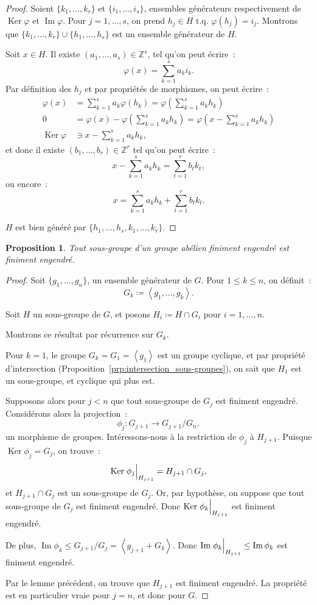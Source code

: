\documentclass{article}
\newtheorem{prp}[thm]{Proposition}
\theoremstyle{definition}
\theoremstyle{remark}
\DeclareMathOperator{\Imf}{Im}
\DeclareMathOperator{\Ker}{Ker}
\newcommand{\Z}{\mathbb Z}
\newcommand{\tq}{\text{ t.q. }}
\newcommand{\eng}[1]{\left\langle#1\right\rangle}
\newcommand{\restr}[2]{\left.#1\vphantom{\big|}\right|_{#2}}
\begin{document}
	\begin{proof} Soient $\{k_1, \ldots, k_r\}$ et $\{i_1, \ldots, i_s\}$, ensembles générateurs respectivement de $\Ker \varphi$ et $\Imf \varphi$.
	Pour $j = 1, \ldots, s$, on prend $h_j \in H \tq \varphi(h_j) = i_j$. Montrons que $\{k_1, \ldots, k_r\} \cup \{h_1, \ldots, h_s\}$ est un ensemble
	générateur de $H$.

	Soit $x \in H$. Il existe $(a_1, \ldots, a_s) \in \Z^s$, tel qu'on peut écrire~:
	\[\varphi(x) = \sum_{k=1}^sa_ki_k.\]
	Par définition des $h_j$ et par propriétés de morphismes, on peut écrire~:
	\begin{align*}
		\varphi(x) &= \sum_{k=1}^sa_k\varphi(h_k) = \varphi\left(\sum_{k=1}^sa_kh_k\right) \\
		0 &= \varphi(x) - \varphi\left(\sum_{k=1}^sa_kh_k\right) = \varphi\left(x - \sum_{k=1}^sa_kh_k\right) \\
		\Ker \varphi &\ni x - \sum_{k=1}^sa_kh_k,
	\end{align*}
	et donc il existe $(b_1, \ldots, b_r) \in \Z^r$ tel qu'on peut écrire~:
	\[x - \sum_{k=1}^sa_kh_k = \sum_{t=1}^rb_tk_t,\]
	ou encore~:
	\[x = \sum_{k=1}^sa_kh_k + \sum_{t=1}^rb_tk_t.\]

	$H$ est bien généré par $\{h_1, \ldots, h_s, k_1, \ldots, k_r\}$.
	\end{proof}

	\begin{prp} Tout sous-groupe d'un groupe abélien finiment engendré est finiment engendré.
	\end{prp}

	\begin{proof} Soit $\{g_1, \ldots, g_n\}$, un ensemble générateur de $G$. Pour $1 \leq k \leq n$, on définit~:
	\[G_k \coloneqq \eng{g_1, \ldots, g_k}.\]

	Soit $H$ un sous-groupe de $G$, et posons $H_i \coloneqq H \cap G_i$ pour $i = 1, \ldots, n$.

	Montrons ce résultat par récurrence sur $G_k$.

	Pour $k=1$, le groupe $G_k = G_1 = \eng {g_1}$ est un groupe cyclique, et par propriété d'intersection (Proposition~\ref{prp:intersection_sous-groupes}), on
	sait que $H_1$ est un sous-groupe, et cyclique qui plus est.

	Supposons alors pour $j < n$ que tout sous-groupe de $G_j$ est finiment engendré. Considérons alors la projection~:
	\[\phi_j : G_{j+1} \to G_{j+1}/G_n,\]
	un morphisme de groupes. Intéressons-nous à la restriction de $\phi_j$ à $H_{j+1}$. Puisque $\Ker \phi_j = G_j$, on trouve~:
	\[\Ker \restr {\phi_j}{H_{j+1}} = H_{j+1} \cap G_j,\]
	et $H_{j+1} \cap G_j$ est un sous-groupe de $G_j$. Or, par hypothèse, on suppose que tout sous-groupe de $G_j$ est finiment engendré. Donc
	$\Ker \restr {\phi_k}{H_{j+1}}$ est finiment engendré.

	De plus, $\Imf \phi_k \leq G_{j+1}/G_j = \eng {g_{j+1}+G_k}$. Donc $\Imf \restr {\phi_k}{H_{j+1}} \leq \Imf \phi_k$ est finiment engendré.

	Par le lemme précédent, on trouve que $H_{j+1}$ est finiment engendré. La propriété est en particulier vraie pour $j=n$, et donc pour $G$.
	\end{proof}
\end{document}

